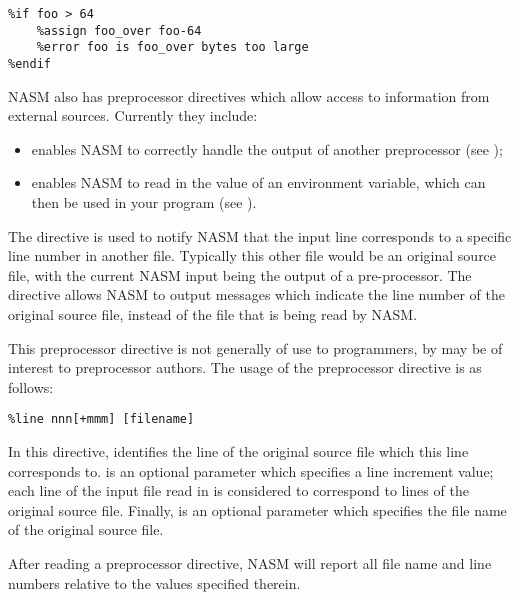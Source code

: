 \begin{lstlisting}
%if foo > 64
    %assign foo_over foo-64
    %error foo is foo_over bytes too large
%endif
\end{lstlisting}


NASM also has preprocessor directives which allow access to
information from external sources. Currently they include:

\begin{itemize}
    \item{ enables NASM to correctly handle
        the output of another preprocessor (see );}
    \item{ enables NASM to read in the value
        of an environment variable, which can then be used in
        your program (see ).}
\end{itemize}


The  directive is used to notify NASM that the input line
corresponds to a specific line number in another file. Typically
this other file would be an original source file, with the current
NASM input being the output of a pre-processor. The 
directive allows NASM to output messages which indicate the line
number of the original source file, instead of the file that is being
read by NASM.

This preprocessor directive is not generally of use to programmers,
by may be of interest to preprocessor authors. The usage of the
 preprocessor directive is as follows:

\begin{lstlisting}
%line nnn[+mmm] [filename]
\end{lstlisting}

In this directive,  identifies the line of the original source
file which this line corresponds to.  is an optional parameter
which specifies a line increment value; each line of the input file
read in is considered to correspond to  lines of the original
source file. Finally,  is an optional parameter which
specifies the file name of the original source file.

After reading a  preprocessor directive, NASM will report
all file name and line numbers relative to the values specified
therein.


